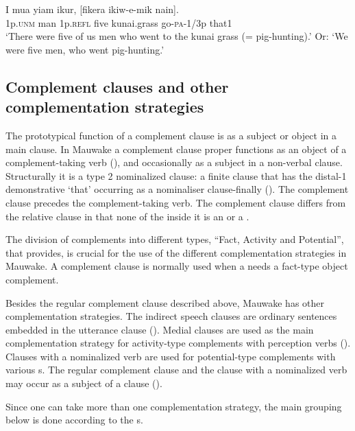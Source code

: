 \ea%
\label{ex:8:x1570}
\gll I  mua  yiam  ikur,  [fikera  ikiw-e-mik  nain]. \\
1p.\textsc{unm} man 1p.\textsc{refl} five kunai.grass go-\textsc{pa}-1/3p that1\\
\glt`There were five of us men who went to the kunai grass (= pig-hunting).' Or: `We were five men, who went pig-hunting.'
\z


\subsection{Complement clauses and other complementation strategies} \label{sec:8.3.2}

The prototypical function of a complement clause is as a subject or object in a main clause. In Mauwake a complement clause proper functions as an object of a complement-taking verb (), and occasionally as a subject in a non-verbal clause. Structurally it is a type 2 nominalized clause: a finite clause that has the distal-1 demonstrative  `that' occurring as a nominaliser clause-finally (). The complement clause precedes the complement-taking verb. The complement clause differs from the relative clause in that none of the  inside it is an  or a . 

The division of complements into different types, ``Fact, Activity and Potential'', that \citet[371]{Dixon2010b} provides, is crucial for the use of the different complementation strategies in Mauwake.  A complement clause is normally used when a  needs a fact-type object complement.

Besides the regular complement clause described above, Mauwake has other complementation strategies. The indirect speech clauses are ordinary sentences embedded in the utterance clause (). Medial clauses are used as the main complementation strategy for activity-type complements with perception verbs (). Clauses with a nominalized verb are used for potential-type complements with various s. The regular complement clause and the clause with a nominalized verb may occur as a subject of a clause (). 

Since one  can take more than one complementation strategy, the main grouping below is done according to the s.

